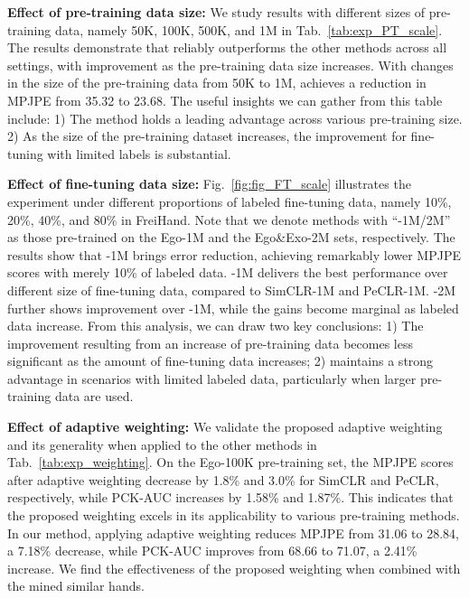 \textbf{Effect of pre-training data size:}
We study results with different sizes of pre-training data, namely 50K, 100K, 500K, and 1M in Tab.~\ref{tab:exp_PT_scale}. The results demonstrate that \Ours reliably outperforms the other methods across all settings, with improvement as the pre-training data size increases. With changes in the size of the pre-training data from 50K to 1M, \Ours achieves a reduction in MPJPE from 35.32 to 23.68. The useful insights we can gather from this table include: 1) The \Ours method holds a leading advantage across various pre-training size. 2) As the size of the pre-training dataset increases, the improvement for fine-tuning with limited labels is substantial.

\textbf{Effect of fine-tuning data size:}
Fig.~\ref{fig:fig_FT_scale} illustrates the experiment under different proportions of labeled fine-tuning data, namely 10\%, 20\%, 40\%, and 80\% in FreiHand. Note that we denote methods with ``-1M/2M'' as those pre-trained on the Ego-1M and the Ego\&Exo-2M sets, respectively. The results show that \Ours-1M brings error reduction, achieving remarkably lower MPJPE scores with merely 10\% of labeled data. \Ours-1M delivers the best performance over different size of fine-tuning data, compared to SimCLR-1M and PeCLR-1M. \Ours-2M further shows improvement over \Ours-1M, while the gains become marginal as labeled data increase. From this analysis, we can draw two key conclusions: 1) The improvement resulting from an increase of pre-training data becomes less significant as the amount of fine-tuning data increases; 2) \Ours maintains a strong advantage in scenarios with limited labeled data, particularly when larger pre-training data are used.

\textbf{Effect of adaptive weighting:}
We validate the proposed adaptive weighting and its generality when applied to the other methods in Tab.~\ref{tab:exp_weighting}.
On the Ego-100K pre-training set, the MPJPE scores after adaptive weighting decrease by 1.8\% and 3.0\% for SimCLR and PeCLR, respectively, while PCK-AUC increases by 1.58\% and 1.87\%.
This indicates that the proposed weighting excels in its applicability to various pre-training methods. In our \Ours method, applying adaptive weighting reduces MPJPE from 31.06 to 28.84, a 7.18\% decrease, while PCK-AUC improves from 68.66 to 71.07, a 2.41\% increase. We find the effectiveness of the proposed weighting when combined with the mined similar hands.



